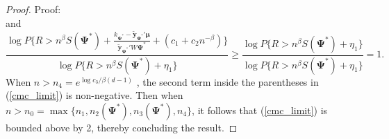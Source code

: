 \documentclass[final,11pt,3p]{article}\usepackage{setspace}
\begin{document}
\begin{proof}{Proof:}
\begin{equation*}
\end{equation*}
and
\begin{equation*}
\frac{\log {P} \{ R > n^{\beta} S(\boldsymbol{\Psi}^*)+ \frac{k_{\boldsymbol{\Psi}^*}- \tilde{\boldsymbol{y}}_{\boldsymbol{\Psi}^*}' \boldsymbol{\mu}}{ \tilde{\boldsymbol{y}}_{\boldsymbol{\Psi}^*}' W \boldsymbol{\Psi}^*}+ (c_1 + c_2 n^{-\beta})\} }{\log {P}\{ R >  n^{\beta} S(\boldsymbol{\Psi}^*) + \eta_1 \}} \ge \frac{\log {P} \{ R > n^{\beta} S(\boldsymbol{\Psi}^*)+ \eta_1\} }{\log {P}\{ R >  n^{\beta} S(\boldsymbol{\Psi}^*) + \eta_1 \}} =1.
\end{equation*}
When $n > n_4 = e^{\log c_3 / \beta(d-1)}$ , the second term inside the parentheses in (\ref{cmc_limit}) is non-negative. Then when $n > n_0 = \max\{n_1, n_2(\boldsymbol{\Psi}^*), n_3(\boldsymbol{\Psi}^*), n_4 \}$, it follows that (\ref{cmc_limit}) is bounded above by 2, thereby concluding the result. {}
\end{proof}
\end{document}

